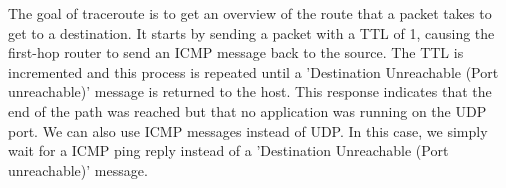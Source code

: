 The goal of traceroute is to get an overview of the route that a packet takes to get to a destination. It starts by sending a packet with a TTL of 1, causing the first-hop router to send an ICMP message back to the source. The TTL is incremented and this process is repeated until a 'Destination Unreachable (Port unreachable)' message is returned to the host. This response indicates that the end of the path was reached but that no application was running on the UDP port. We can also use ICMP messages instead of UDP. In this case, we simply wait for a ICMP ping reply instead of a 'Destination Unreachable (Port unreachable)' message.
